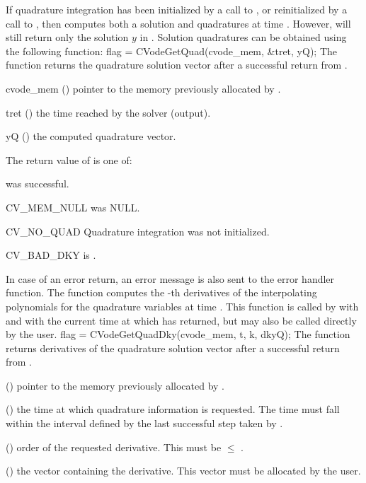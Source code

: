 If quadrature integration has been initialized by a call to ,
or reinitialized by a call to , then {\cvodes} computes both a solution
and quadratures at time . However,  will still return only the solution
$y$ in . Solution quadratures can be obtained using the following function:
{
  flag = CVodeGetQuad(cvode\_mem, \&tret, yQ);
}
{
  The function  returns the quadrature solution vector after a
  successful return from .
}
{
  \begin{args}
  \item[cvode\_mem] ()
    pointer to the memory previously allocated by .
  \item[tret] ()
    the time reached by the solver (output).
  \item[yQ] ()
    the computed quadrature vector.
  \end{args}
}
{
  The return value  of  is one of:
  \begin{args}
  \item[\Id{CV\_SUCCESS}] 
     was successful.
  \item[CV\_MEM\_NULL] 
     was NULL.
  \item[CV\_NO\_QUAD] 
    Quadrature integration was not initialized.
  \item[CV\_BAD\_DKY] 
     is .
  \end{args}
}
{
  In case of an error return, an error message is also sent to the error handler
  function.
}
The function  computes the -th derivatives of the interpolating 
polynomials for the quadrature variables at time .
This function is called by  with  and with the current time
at which  has returned, but may also be called 
directly by the user.
{
  flag = CVodeGetQuadDky(cvode\_mem, t, k, dkyQ);
}
{
  The function  returns derivatives of the quadrature solution 
  vector after a successful return from .
}
{
  \begin{args}
  \item[\id{cvode\_mem}] ()
    pointer to the memory previously allocated by .
  \item[\id{t}] ()
    the time at which quadrature information is 
    requested. The time  must fall within the interval defined by the last 
    successful step taken by {\cvodes}.
  \item[\id{k}] () order of the requested derivative.  This
    must be $\leq$ . 
  \item[\id{dkyQ}] ()
    the vector containing the derivative. This vector must be allocated by the user. 
  \end{args}
}
